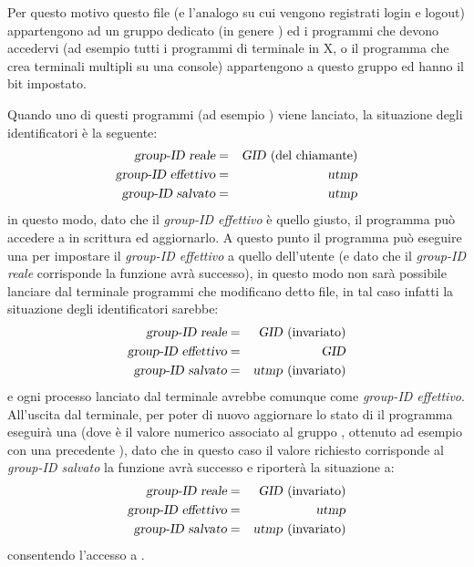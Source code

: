 Per questo motivo questo file (e l'analogo  su cui
vengono registrati login e logout) appartengono ad un gruppo dedicato (in
genere ) ed i programmi che devono accedervi (ad esempio tutti i
programmi di terminale in X, o il programma  che crea terminali
multipli su una console) appartengono a questo gruppo ed hanno il bit
 impostato.

Quando uno di questi programmi (ad esempio ) viene lanciato, la
situazione degli identificatori è la seguente:
\begin{eqnarray*}
  \label{eq:1}
  \textsl{group-ID reale}      &=& \textrm{\textsl{GID} (del chiamante)} \\
  \textsl{group-ID effettivo}  &=& \textrm{\textsl{utmp}} \\
  \textsl{group-ID salvato}    &=& \textrm{\textsl{utmp}}
\end{eqnarray*}
in questo modo, dato che il \textsl{group-ID effettivo} è quello giusto, il
programma può accedere a  in scrittura ed aggiornarlo.
A questo punto il programma può eseguire una  per
impostare il \textsl{group-ID effettivo} a quello dell'utente (e dato che il
\textsl{group-ID reale} corrisponde la funzione avrà successo), in questo modo
non sarà possibile lanciare dal terminale programmi che modificano detto file,
in tal caso infatti la situazione degli identificatori sarebbe:
\begin{eqnarray*}
  \label{eq:2}
  \textsl{group-ID reale}      &=& \textrm{\textsl{GID} (invariato)}  \\
  \textsl{group-ID effettivo}  &=& \textrm{\textsl{GID}} \\
  \textsl{group-ID salvato}    &=& \textrm{\textsl{utmp} (invariato)}
\end{eqnarray*}
e ogni processo lanciato dal terminale avrebbe comunque  come
\textsl{group-ID effettivo}. All'uscita dal terminale, per poter di nuovo
aggiornare lo stato di  il programma eseguirà una
 (dove  è il valore numerico associato al gruppo
, ottenuto ad esempio con una precedente ), dato che
in questo caso il valore richiesto corrisponde al \textsl{group-ID salvato} la
funzione avrà successo e riporterà la situazione a:
\begin{eqnarray*}
  \label{eq:3}
  \textsl{group-ID reale}      &=& \textrm{\textsl{GID} (invariato)}  \\
  \textsl{group-ID effettivo}  &=& \textrm{\textsl{utmp}} \\
  \textsl{group-ID salvato}    &=& \textrm{\textsl{utmp} (invariato)}
\end{eqnarray*}
consentendo l'accesso a .

